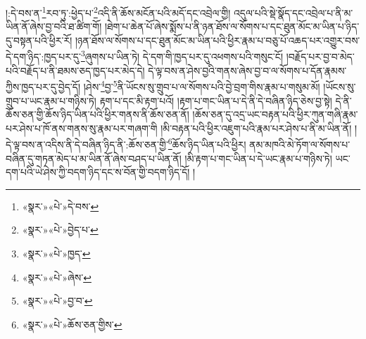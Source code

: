 །:དེ་བས་ན་\footnote{«སྣར་»«པེ་»དེ་བས་}རབ་ཏུ་:ཕྱེད་པ་\footnote{«སྣར་»«པེ་»བྱེད་པ་}འདི་ནི་ཆོས་མངོན་པའི་མདོ་དང་འབྲེལ་གྱི། འདུལ་པའི་སྡེ་སྣོད་དང་འབྲེལ་པ་ནི་མ་ཡིན་ནོ་ཞེས་བྱ་བའི་ཐ་ཚིག་གོ། །ཐེག་པ་ཆེན་པོ་ཞེས་སྨོས་པ་ནི་ཉན་ཐོས་ལ་སོགས་པ་དང་ཐུན་མོང་མ་ཡིན་པ་ཉིད་དུ་བསྟན་པའི་ཕྱིར་རོ། །ཉན་ཐོས་ལ་སོགས་པ་དང་ཐུན་མོང་མ་ཡིན་པའི་ཕྱིར་རྣམ་པ་བཅུ་པོ་འཆད་པར་འགྱུར་བས་དེ་དག་ཉིད་:ཁྱད་པར་དུ་\footnote{«སྣར་»«པེ་»ཁྱད་}ཞུགས་པ་ཡིན་ཏེ། དེ་དག་གི་ཁྱད་པར་དུ་འཕགས་པའི་གསུང་ངོ། །བརྗོད་པར་བྱ་བ་མེད་པའི་བརྗོད་པ་ནི་ཐམས་ཅད་ཁྱད་པར་མེད་དེ། དེ་ལྟ་བས་ན་ཤེས་བྱའི་གནས་ཞེས་བྱ་བ་ལ་སོགས་པ་དོན་རྣམས་ཀྱིས་ཁྱད་པར་དུ་བྱེད་དོ། །ཤེས་\footnote{«སྣར་»«པེ་»ཞེས་}བྱ་\footnote{«སྣར་»«པེ་»བྱ་བ་}ནི་ཡོངས་སུ་གྲུབ་པ་ལ་སོགས་པའི་བྱེ་བྲག་གིས་རྣམ་པ་གསུམ་མོ། །ཡོངས་སུ་གྲུབ་པ་ཡང་རྣམ་པ་གཉིས་ཏེ། རྟག་པ་དང་མི་རྟག་པའོ། །རྟག་པ་གང་ཡིན་པ་དེ་ནི་དེ་བཞིན་ཉིད་ཅེས་བྱ་སྟེ། དེ་ནི་ཆོས་ཅན་གྱི་ཆོས་ཉིད་ཡིན་པའི་ཕྱིར་གནས་ནི་ཆོས་ཅན་ནོ། །ཆོས་ཅན་དུ་འདྲ་ཡང་བརྟན་པའི་ཕྱིར་ཀུན་གཞི་རྣམ་པར་ཤེས་པ་ཁོ་ནས་གནས་སུ་རྣམ་པར་གཞག་གི །མི་བརྟན་པའི་ཕྱིར་འཇུག་པའི་རྣམ་པར་ཤེས་པ་ནི་མ་ཡིན་ནོ། །དེ་ལྟ་བས་ན་འདིས་ནི་དེ་བཞིན་ཉིད་ནི་:ཆོས་ཅན་གྱི་\footnote{«སྣར་»«པེ་»ཆོས་ཅན་གྱིས་}ཆོས་ཉིད་ཡིན་པའི་ཕྱིར། ནམ་མཁའི་མེ་ཏོག་ལ་སོགས་པ་བཞིན་དུ་གཏན་མེད་པ་མ་ཡིན་ནོ་ཞེས་བཤད་པ་ཡིན་ནོ། །མི་རྟག་པ་གང་ཡིན་པ་དེ་ཡང་རྣམ་པ་གཉིས་ཏེ། ཡང་དག་པའི་ཡེ་ཤེས་ཀྱི་བདག་ཉིད་དང་ས་བོན་གྱི་བདག་ཉིད་དོ། །

